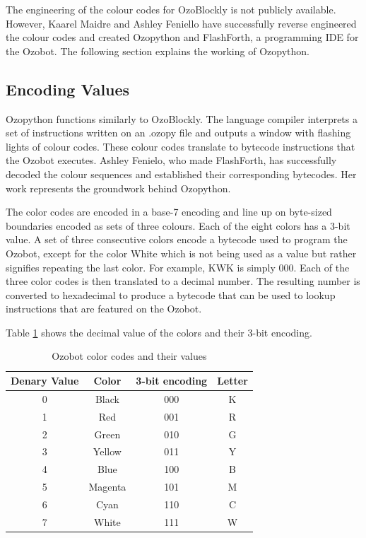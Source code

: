 \documentclass[oneside,%
                    author={Malak Hajji},
                    degree={BSc},
                    title={Designing An Accessible Ozobot Programming Platform for Students},
                  subtitle={With Mixed Visual Abilities}]{dissertation}
\begin{document}
The engineering of the colour codes for OzoBlockly is not publicly available. However, Kaarel Maidre and Ashley Feniello have successfully reverse engineered the colour codes and created Ozopython and FlashForth\cite{ashley}, a programming IDE for the Ozobot. The following section explains the working of Ozopython.  

\subsection{Encoding Values}
Ozopython functions similarly to OzoBlockly. The language compiler interprets a set of instructions written on an .ozopy file and outputs a window with flashing lights  of colour codes. These colour codes translate to bytecode instructions that the Ozobot executes. Ashley Fenielo, who made FlashForth, has successfully decoded the colour sequences and established their corresponding bytecodes\cite{ashley}. Her work represents the groundwork behind Ozopython.

The color codes are encoded in a base-7 encoding and line up on byte-sized boundaries encoded as sets of three colours. Each of the eight colors has a 3-bit value. A set of three consecutive colors encode a bytecode used to program the Ozobot, except for the color White which is not being used as a value but rather signifies repeating the last color. For example, KWK is simply 000. Each of the three color codes is then translated to a decimal number. The resulting number is converted to hexadecimal to produce a bytecode that can be used to lookup instructions that are featured on the Ozobot. 

Table \ref{tab-colors} shows the decimal value of the colors and their 3-bit encoding.
\FloatBarrier
\begin{table}[h]
\centering
\begin{tabular}{|c|c|c|c|}
\hline
\textbf{Denary Value}  &\textbf{Color}  & \textbf{3-bit encoding} &  \textbf{Letter}  \\ \hline
0     &Black &000 &K   \\ \hline
1    &Red   &001 &R            \\ \hline
2   &Green &010 &G               \\ \hline
3    &Yellow  & 011 &Y              \\ \hline
4   &Blue &100 &B                \\ \hline
5   &Magenta &101&M             \\ \hline
6   &Cyan & 110 & C                \\ \hline
7   &White & 111 &W               \\ \hline

\hline
\end{tabular}
\caption{Ozobot color codes and their values\cite{ashley}}
\label{tab-colors}
\end{table}
\FloatBarrier
\end{document}
